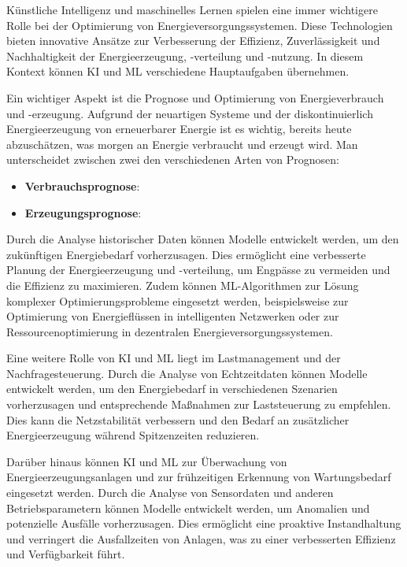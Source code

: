 Künstliche Intelligenz und maschinelles Lernen spielen eine immer wichtigere
Rolle bei der Optimierung von Energieversorgungssystemen. Diese Technologien
bieten innovative Ansätze zur Verbesserung der Effizienz, Zuverlässigkeit und
Nachhaltigkeit der Energieerzeugung, -verteilung und -nutzung. In diesem
Kontext können KI und ML verschiedene Hauptaufgaben übernehmen.

Ein wichtiger Aspekt ist die Prognose und Optimierung von Energieverbrauch und
-erzeugung. Aufgrund der neuartigen Systeme und der diskontinuierlich
Energieerzeugung von erneuerbarer Energie ist es wichtig, bereits heute
abzuschätzen, was morgen an Energie verbraucht und erzeugt wird. Man
unterscheidet zwischen zwei den verschiedenen Arten von Prognosen:

\begin{itemize}
      \item \textbf{Verbrauchsprognose}:
            
      \item \textbf{Erzeugungsprognose}:
            
\end{itemize}

Durch die Analyse historischer Daten können Modelle entwickelt werden, um den
zukünftigen Energiebedarf vorherzusagen. Dies ermöglicht eine verbesserte
Planung der Energieerzeugung und -verteilung, um Engpässe zu vermeiden und die
Effizienz zu maximieren. Zudem können ML-Algorithmen zur Lösung komplexer
Optimierungsprobleme eingesetzt werden, beispielsweise zur Optimierung von
Energieflüssen in intelligenten Netzwerken oder zur Ressourcenoptimierung in
dezentralen Energieversorgungssystemen.

Eine weitere Rolle von KI und ML liegt im Lastmanagement und der
Nachfragesteuerung. Durch die Analyse von Echtzeitdaten können Modelle
entwickelt werden, um den Energiebedarf in verschiedenen Szenarien
vorherzusagen und entsprechende Maßnahmen zur Laststeuerung zu empfehlen. Dies
kann die Netzstabilität verbessern und den Bedarf an zusätzlicher
Energieerzeugung während Spitzenzeiten reduzieren.

Darüber hinaus können KI und ML zur Überwachung von Energieerzeugungsanlagen
und zur frühzeitigen Erkennung von Wartungsbedarf eingesetzt werden. Durch die
Analyse von Sensordaten und anderen Betriebsparametern können Modelle
entwickelt werden, um Anomalien und potenzielle Ausfälle vorherzusagen. Dies
ermöglicht eine proaktive Instandhaltung und verringert die Ausfallzeiten von
Anlagen, was zu einer verbesserten Effizienz und Verfügbarkeit führt.

